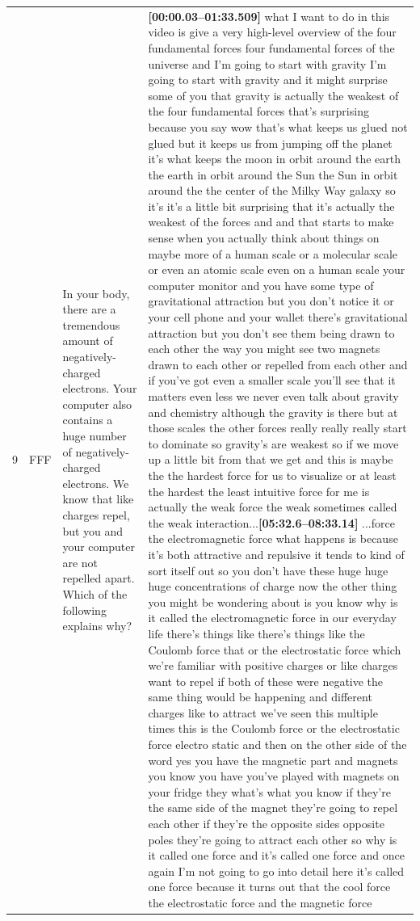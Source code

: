 \documentclass[10pt]{article}
\begin{document}
\begin{tiny}
\begin{longtable}{|r|p{0.375in}|p{1.275in}|p{3.5in}|}
9  &          FFF &  In your body, there are a tremendous amount of negatively-charged electrons. Your computer also contains a huge number of negatively-charged electrons. We know that like charges repel, but you and your computer are not repelled apart. Which of the following explains why? &  \textbf{[00:00.03--01:33.509]} what I want to do in this video is give a very high-level overview of the four fundamental forces four fundamental forces of the universe and I'm going to start with gravity I'm going to start with gravity and it might surprise some of you that gravity is actually the weakest of the four fundamental forces that's surprising because you say wow that's what keeps us glued not glued but it keeps us from jumping off the planet it's what keeps the moon in orbit around the earth the earth in orbit around the Sun the Sun in orbit around the the center of the Milky Way galaxy so it's it's a little bit surprising that it's actually the weakest of the forces and and that starts to make sense when you actually think about things on maybe more of a human scale or a molecular scale or even an atomic scale even on a human scale your computer monitor and you have some type of gravitational attraction but you don't notice it or your cell phone and your wallet there's gravitational attraction but you don't see them being drawn to each other the way you might see two magnets drawn to each other or repelled from each other and if you've got even a smaller scale you'll see that it matters even less we never even talk about gravity and chemistry although the gravity is there but at those scales the other forces really really really start to dominate so gravity's are weakest so if we move up a little bit from that we get and this is maybe the the hardest force for us to visualize or at least the hardest the least intuitive force for me is actually the weak force the weak sometimes called the weak interaction...\newline\textbf{[05:32.6--08:33.14]} ...force the electromagnetic force what happens is because it's both attractive and repulsive it tends to kind of sort itself out so you don't have these huge huge huge concentrations of charge now the other thing you might be wondering about is you know why is it called the electromagnetic force in our everyday life there's things like there's things like the Coulomb force that or the electrostatic force which we're familiar with positive charges or like charges want to repel if both of these were negative the same thing would be happening and different charges like to attract we've seen this multiple times this is the Coulomb force or the electrostatic force electro static and then on the other side of the word yes you have the magnetic part and magnets you know you have you've played with magnets on your fridge they what's what you know if they're the same side of the magnet they're going to repel each other if they're the opposite sides opposite poles they're going to attract each other so why is it called one force and it's called one force and once again I'm not going to go into detail here it's called one force because it turns out that the cool force the electrostatic force and the magnetic force 
\end{longtable}
\end{tiny}
\end{document}
